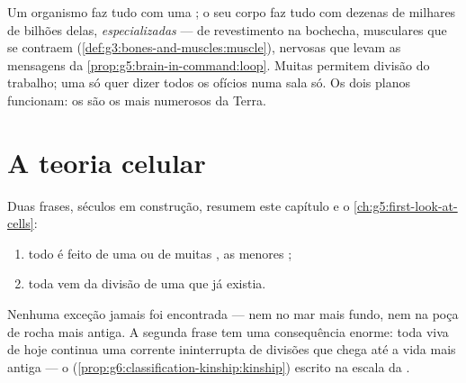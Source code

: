 \begin{remark}\label{rem:g6:cell-unit-of-life:twoways}
Um organismo  faz tudo com uma ; o seu corpo faz tudo
com dezenas de milhares de bilhões delas, \emph{especializadas} ---
 de revestimento na bochecha,  musculares que se
contraem (\cref{def:g3:bones-and-muscles:muscle}),  nervosas
que levam as mensagens da \cref{prop:g5:brain-in-command:loop}. Muitas
 permitem divisão do trabalho; uma  só quer dizer todos
os ofícios numa sala só. Os dois planos funcionam: os  são
os  mais numerosos da Terra.
\end{remark}

\section{A teoria celular}

\begin{proposition}\label{prop:g6:cell-unit-of-life:theory}
Duas frases, séculos em construção, resumem este capítulo e o
\cref{ch:g5:first-look-at-cells}:
\begin{enumerate}
  \item todo  é feito de uma ou de muitas , as menores
        ;
  \item toda  vem da divisão de uma  que já existia.
\end{enumerate}
Nenhuma exceção jamais foi encontrada --- nem no mar mais fundo, nem na
poça de rocha mais antiga. A segunda frase tem uma consequência
enorme: toda  viva de hoje continua uma corrente ininterrupta de
divisões que chega até a vida mais antiga --- o 
(\cref{prop:g6:classification-kinship:kinship}) escrito na escala da
.
\end{proposition}
\admitted

